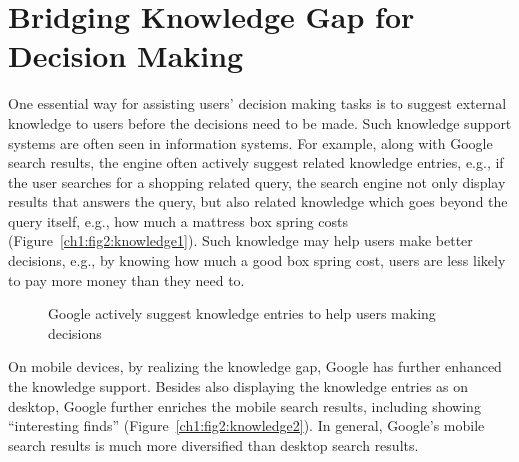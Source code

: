 \section{Bridging Knowledge Gap for Decision Making}

One essential way for assisting users' decision making tasks is to suggest external knowledge to users before the decisions need to be made. Such knowledge support systems are often seen in information systems. For example, along with Google search results, the engine often actively suggest related knowledge entries, e.g., if the user searches for a shopping related query, the search engine not only display results that answers the query, but also related knowledge which goes beyond the query itself, e.g., how much a mattress box spring costs (Figure~\ref{ch1:fig2:knowledge1}). Such knowledge may help users make better decisions, e.g., by knowing how much a good box spring cost, users are less likely to pay more money than they need to. 

\begin{figure}[h]
\centering
{}\hfill
{}
\caption{Google actively suggest knowledge entries to help users making decisions}
\end{figure}

On mobile devices, by realizing the knowledge gap, Google has further enhanced the knowledge support. Besides also displaying the knowledge entries as on desktop, Google further enriches the mobile search results, including showing ``interesting finds'' (Figure~\ref{ch1:fig2:knowledge2}). In general, Google's mobile search results is much more diversified than desktop search results. 

